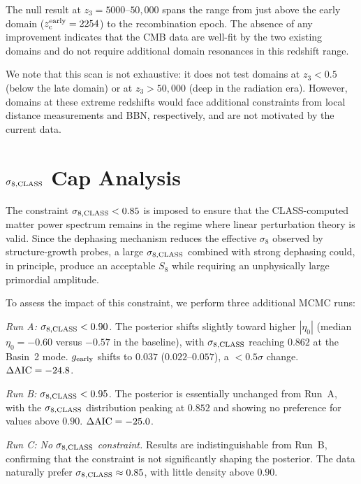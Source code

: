 \documentclass[aps,prd,twocolumn,superscriptaddress,nofootinbib]{revtex4-2}
\newcommand{\zc}{z_{\rm c}}
\newcommand{\dAIC}{\Delta{\rm AIC}}
\newcommand{\gearly}{g_{\rm early}}
\newcommand{\etaz}{\eta_0}
\begin{document}
The null result at $z_3 = 5000$--$50{,}000$ spans the range from just
above the early domain ($\zc^{\rm early} = 2254$) to the
recombination epoch. The absence of any improvement indicates that the
CMB data are well-fit by the two existing domains and do not require
additional domain resonances in this redshift range.

We note that this scan is not exhaustive: it does not test domains at
$z_3 < 0.5$ (below the late domain) or at $z_3 > 50{,}000$ (deep in
the radiation era). However, domains at these extreme redshifts would
face additional constraints from local distance measurements and BBN,
respectively, and are not motivated by the current data.

\section{$\sigma_{8,\rm CLASS}$ Cap Analysis}
\label{app:sigma8}

The constraint $\sigma_{8,\rm CLASS} < 0.85$ is imposed to ensure
that the CLASS-computed matter power spectrum remains in the regime
where linear perturbation theory is valid. Since the dephasing
mechanism reduces the effective $\sigma_8$ observed by structure-growth
probes, a large $\sigma_{8,\rm CLASS}$ combined with strong dephasing
could, in principle, produce an acceptable $S_8$ while requiring an
unphysically large primordial amplitude.

To assess the impact of this constraint, we perform three additional
MCMC runs:

\textit{Run A: $\sigma_{8,\rm CLASS} < 0.90$.} The posterior shifts
slightly toward higher $|\etaz|$ (median $\etaz = -0.60$ versus
$-0.57$ in the baseline), with $\sigma_{8,\rm CLASS}$ reaching
$0.862$ at the Basin~2 mode. $\gearly$ shifts to $0.037$ ($0.022$--$0.057$),
a $< 0.5\sigma$ change. $\dAIC = -24.8$.

\textit{Run B: $\sigma_{8,\rm CLASS} < 0.95$.} The posterior is
essentially unchanged from Run~A, with the $\sigma_{8,\rm CLASS}$
distribution peaking at $0.852$ and showing no preference for values
above $0.90$. $\dAIC = -25.0$.

\textit{Run C: No $\sigma_{8,\rm CLASS}$ constraint.} Results are
indistinguishable from Run~B, confirming that the constraint is not
significantly shaping the posterior. The data naturally prefer
$\sigma_{8,\rm CLASS} \approx 0.85$, with little density above $0.90$.
\end{document}
